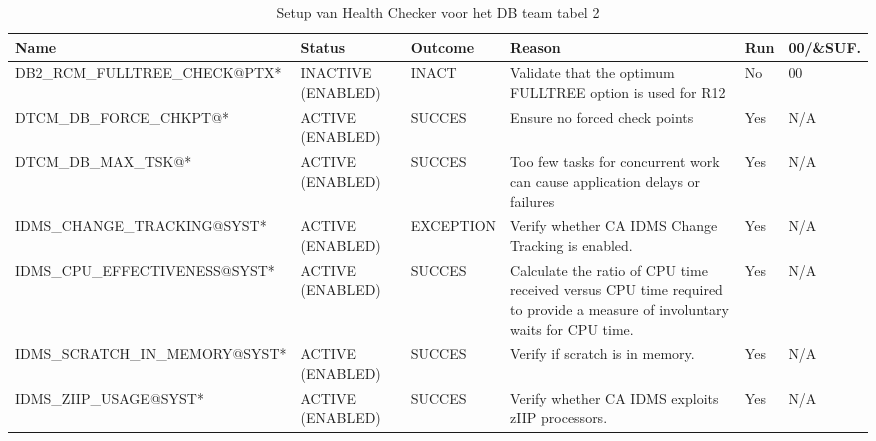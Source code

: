 \begin{landscape}
	\begin{table}[h]
		\begin{tabular}{|l|p{2.3cm}|l|p{4.5cm}|l|l|}
			\hline
			\textbf{Name}                       & \textbf{Status}   & \textbf{Outcome} & \textbf{Reason}    & \textbf{Run} &	\textbf{00/\&SUF.} \\ \hline
			DB2\_RCM\_FULLTREE\_CHECK@PTX*  & INACTIVE (ENABLED) & INACT     & Validate   that the optimum FULLTREE option is used for R12                                                                   & No  & 00  \\ \hline
			DTCM\_DB\_FORCE\_CHKPT@*        & ACTIVE (ENABLED)   & SUCCES    & Ensure   no forced check points                                                                                               & Yes & N/A \\ \hline
			DTCM\_DB\_MAX\_TSK@*            & ACTIVE (ENABLED)   & SUCCES    & Too few   tasks for concurrent work can cause application delays or failures                                                  & Yes & N/A \\ \hline
			IDMS\_CHANGE\_TRACKING@SYST*    & ACTIVE (ENABLED)   & EXCEPTION & Verify   whether CA IDMS Change Tracking is enabled.                                                                          & Yes & N/A \\ \hline
			IDMS\_CPU\_EFFECTIVENESS@SYST*  & ACTIVE (ENABLED)   & SUCCES    & Calculate   the ratio of CPU time received versus CPU time required to provide a measure   of involuntary waits for CPU time. & Yes & N/A \\ \hline
			IDMS\_SCRATCH\_IN\_MEMORY@SYST* & ACTIVE (ENABLED)   & SUCCES    & Verify   if scratch is in memory.                                                                                             & Yes & N/A \\ \hline
			IDMS\_ZIIP\_USAGE@SYST*         & ACTIVE (ENABLED)   & SUCCES    & Verify   whether CA IDMS exploits zIIP processors.                                                                            & Yes & N/A \\ \hline
		\end{tabular}
		\caption[Health Checker DB team tabel 2]{Setup van Health Checker voor het DB team tabel 2}
		\label{tbl:DB Team Tabel 2}
	\end{table}
\end{landscape}